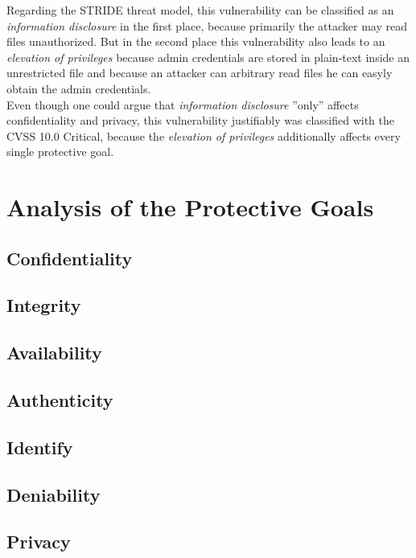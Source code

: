 Regarding the STRIDE threat model, this vulnerability can be classified as an \textit{information disclosure} in the first place, because primarily the attacker may read files unauthorized. But in the second place this vulnerability also leads to an \textit{elevation of privileges} \autocite{Schneider-Folie-2} because admin credentials are stored in plain-text inside an unrestricted file and because an attacker can arbitrary read files he can easyly obtain the admin credentials. \autocite{Tenable2:online}\\
Even though one could argue that \textit{information disclosure} ''only'' affects confidentiality and privacy, this vulnerability justifiably was classified with the CVSS 10.0 Critical, because the \textit{elevation of privileges} additionally affects every single protective goal. \autocite{Schneider-Folie-2}

\section{Analysis of the Protective Goals}
\label{protective-goals}

\subsection{Confidentiality}
\subsection{Integrity}
\subsection{Availability}
\subsection{Authenticity}
\subsection{Identify}
\subsection{Deniability}
\subsection{Privacy}


